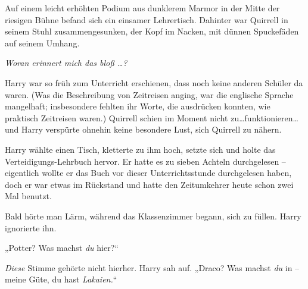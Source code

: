Auf einem leicht erhöhten Podium aus dunklerem Marmor in der Mitte der riesigen Bühne befand sich ein einsamer Lehrertisch. Dahinter war Quirrell in seinem Stuhl zusammengesunken, der Kopf im Nacken, mit dünnen Spuckefäden auf seinem Umhang.

\emph{Woran erinnert mich das bloß …?}

Harry war so früh zum Unterricht erschienen, dass noch keine anderen Schüler da waren. (Was die Beschreibung von Zeitreisen anging, war die englische Sprache mangelhaft; insbesondere fehlten ihr Worte, die ausdrücken konnten, wie praktisch Zeitreisen waren.) Quirrell schien im Moment nicht zu…funktionieren…und Harry verspürte ohnehin keine besondere Lust, sich Quirrell zu nähern.

Harry wählte einen Tisch, kletterte zu ihm hoch, setzte sich und holte das Verteidigungs-Lehrbuch hervor. Er hatte es zu sieben Achteln durchgelesen – eigentlich wollte er das Buch vor dieser Unterrichtsstunde durchgelesen haben, doch er war etwas im Rückstand und hatte den Zeitumkehrer heute schon zwei Mal benutzt.

Bald hörte man Lärm, während das Klassenzimmer begann, sich zu füllen. Harry ignorierte ihn.

„Potter? Was machst \emph{du} hier?“

\emph{Diese} Stimme gehörte nicht hierher. Harry sah auf. „Draco? Was machst \emph{du} in – meine Güte, du hast \emph{Lakaien.}“

